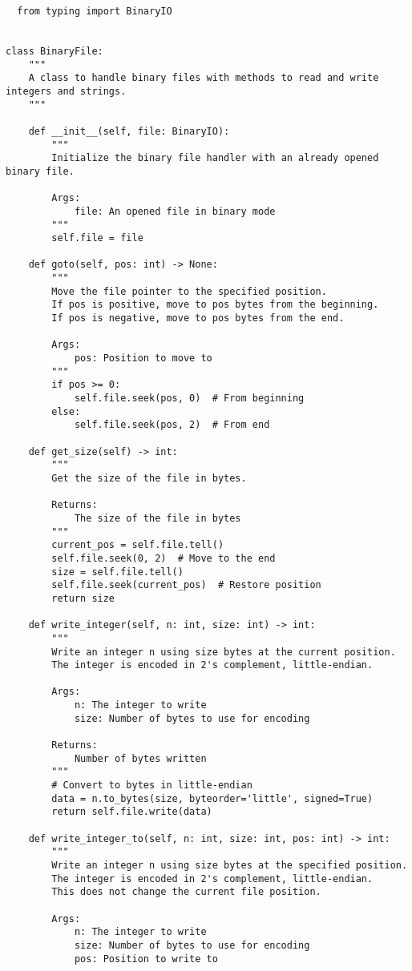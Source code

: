 \documentclass[utf8]{article}
\begin{document}
\begin{verbatim}
  from typing import BinaryIO


class BinaryFile:
    """
    A class to handle binary files with methods to read and write integers and strings.
    """
    
    def __init__(self, file: BinaryIO):
        """
        Initialize the binary file handler with an already opened binary file.
        
        Args:
            file: An opened file in binary mode
        """
        self.file = file
    
    def goto(self, pos: int) -> None:
        """
        Move the file pointer to the specified position.
        If pos is positive, move to pos bytes from the beginning.
        If pos is negative, move to pos bytes from the end.
        
        Args:
            pos: Position to move to
        """
        if pos >= 0:
            self.file.seek(pos, 0)  # From beginning
        else:
            self.file.seek(pos, 2)  # From end
    
    def get_size(self) -> int:
        """
        Get the size of the file in bytes.
        
        Returns:
            The size of the file in bytes
        """
        current_pos = self.file.tell()
        self.file.seek(0, 2)  # Move to the end
        size = self.file.tell()
        self.file.seek(current_pos)  # Restore position
        return size
    
    def write_integer(self, n: int, size: int) -> int:
        """
        Write an integer n using size bytes at the current position.
        The integer is encoded in 2's complement, little-endian.
        
        Args:
            n: The integer to write
            size: Number of bytes to use for encoding
            
        Returns:
            Number of bytes written
        """
        # Convert to bytes in little-endian
        data = n.to_bytes(size, byteorder='little', signed=True)
        return self.file.write(data)
    
    def write_integer_to(self, n: int, size: int, pos: int) -> int:
        """
        Write an integer n using size bytes at the specified position.
        The integer is encoded in 2's complement, little-endian.
        This does not change the current file position.
        
        Args:
            n: The integer to write
            size: Number of bytes to use for encoding
            pos: Position to write to
            

\end{verbatim}
\end{document}
